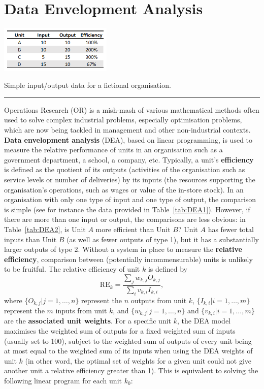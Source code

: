 \section{Data Envelopment Analysis}
\begin{table}
  \begin{center}
    \includegraphics[width=0.4\textwidth]{Images/DEA1}
  \end{center}
  \caption{\small Simple input/output data for a fictional organisation.}\hrule
  \label{tab:DEA1}
\end{table}
Operations Research (OR) is a mish-mash of various mathematical methods often used to solve complex industrial problems, especially optimisation problems, which are now being tackled in management and other non-industrial contexts. \textbf{Data envelopment analysis} (DEA), based on linear programming, is used to measure the relative performance of units in an organisation such as a government department, a school, a company, etc. \newl Typically, a unit's \textbf{efficiency} is defined as the quotient  of its outputs (activities of the organisation such as service levels or number of deliveries) by its inputs (the resources supporting the organisation's operations, such as wages or value of the in-store stock). In an organisation with only one type of input and one type of output, the comparison is simple (see for instance the data provided in Table~\ref{tab:DEA1}). 
However, if there are more than one input or output, the comparisons are less obvious: in Table~\ref{tab:DEA2}, is Unit $A$ more efficient than Unit $B$? Unit $A$ has fewer total inputs than Unit $B$ (as well as fewer outputs of type 1), but it has a substantially larger outputs of type 2. Without a system in place to measure the \textbf{relative efficiency}, comparison between (potentially incommensurable) units is unlikely to be fruitful. The relative efficiency of unit $k$ is defined by $$\mbox{RE}_k = \frac{\sum_j w_{k,j}O_{k,j}}{\sum_i v_{k,i}I_{k,i}}, $$ where $\{O_{k,j}|j=1,\ldots,n\}$ represent the $n$ outputs from unit $k$, $\{I_{k,i}|i=1,\ldots,m\}$ represent the $m$ inputs from unit $k$, and $\{w_{k,j}|j=1,\ldots,n\}$ and $\{v_{k,i}|i=1,\ldots, m\}$ are the \textbf{associated unit weights}. \newl For a specific unit $k$, the DEA model maximises the weighted sum of outputs for a fixed weighted sum of inputs (usually set to 100), subject to the weighted sum of outputs of every unit being at most equal to the weighted sum of its inputs when using the DEA weights of unit $k$ (in other word, the optimal set of weights for a given unit could not give another unit a relative efficiency greater than 1). This is equivalent to solving the following linear program for each unit $k_0$:   
